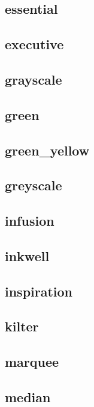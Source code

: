 \subsection{\ttfamily essential}
\newpage
\subsection{\ttfamily executive}
\newpage
\subsection{\ttfamily grayscale}
\newpage
\subsection{\ttfamily green}
\newpage
\subsection{\ttfamily green\_yellow}
\newpage
\subsection{\ttfamily greyscale}
\newpage
\subsection{\ttfamily infusion}
\newpage
\subsection{\ttfamily inkwell}
\newpage
\subsection{\ttfamily inspiration}
\newpage
\subsection{\ttfamily kilter}
\newpage
\subsection{\ttfamily marquee}
\newpage
\subsection{\ttfamily median}
\newpage
